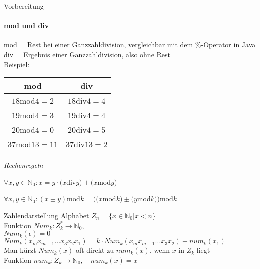 \begin{frame}{Vorbereitung}
 \framesubtitle{mod und div}
 mod = Rest bei einer Ganzzahldivision, vergleichbar mit dem \%-Operator in Java\\
 div = Ergebnis einer Ganzzahldivision, also ohne Rest\\
 Beispiel:\\
 \center
 \begin{tabular}{c|c}
  \textbf{mod}   & \textbf{div}  \\
  \hline
  $18$mod$4=2$   & $18$div$4=4$  \\
  $19$mod$4=3$   & $19$div$4=4$  \\
  $20$mod$4=0$   & $20$div$4=5$  \\
  $37$mod$13=11$ & $37$div$13=2$ \\
 \end{tabular}
 \flushleft
 \emph{Rechenregeln}\\
 \small
 \centerline{$\forall x,y\in\mathbb{N}_{0}:x=y\cdot(x$div$y)+(x$mod$y)$}
 \centerline{$\forall x,y\in\mathbb{N}_{0}:(x\pm y)$mod$k=((x$mod$k)\pm(y$mod$k))$mod$k$}
 \normalsize
\end{frame}

\begin{frame}{Zahlendarstellung}
 Alphabet $Z_{n}=\{x\in\mathbb{N}_{0}\vert x<n\}$\\
 Funktion $Num_{k}: Z_{k}^{\ast}\longrightarrow\mathbb{N}_{0},$\\
 \small
 $Num_{k}(\epsilon)=0$\\
 $Num_{k}(x_{m}x_{m-1}\dots x_{3}x_{2}x_{1})=k\cdot Num_{k}(x_{m}x_{m-1}\dots x_{3}x_{2})+num_{k}(x_{1})$\\
 Man kürzt $Num_{k}(x)$ oft direkt zu $num_{k}(x)$, wenn $x$ in $Z_{k}$ liegt\\
 \normalsize
 Funktion $num_{k}: Z_{k}\longrightarrow\mathbb{N}_{0},$\small$\quad num_{k}(x)=x$\normalsize\\
\end{frame}

